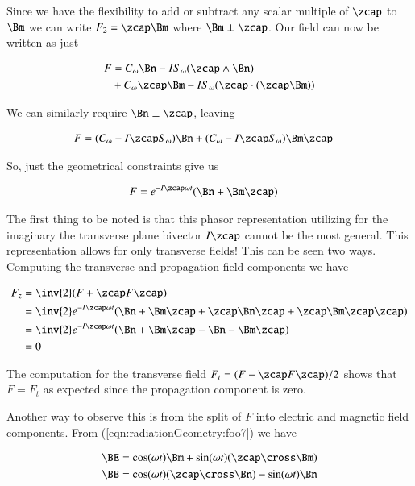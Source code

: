 Since we have the flexibility to add or subtract any scalar multiple of $\zcap$ to $\Bm$ we can write $F_2 = \zcap \Bm$ where $\Bm \perp \zcap$.  Our field can now be written as just

\begin{align*}
F &= 
 C_\omega \Bn - I S_\omega (\zcap \wedge \Bn)  \\
&+ C_\omega \zcap \Bm - I S_\omega (\zcap \cdot (\zcap \Bm)) \\
\end{align*}

We can similarly require $\Bn \perp \zcap$, leaving

\begin{align}\label{eqn:radiationGeometry:foo7}
F &= (C_\omega - I \zcap S_\omega ) \Bn  + (C_\omega - I \zcap S_\omega) \Bm \zcap
\end{align}

So, just the geometrical constraints give us

\begin{align}\label{eqn:radiationGeometry:foo6}
F &= e^{-I\zcap \omega t}(\Bn + \Bm \zcap)
\end{align}

The first thing to be noted is that this phasor representation utilizing for the imaginary the transverse plane bivector $I\zcap$ cannot be the most general.  This representation allows for only transverse fields!  This can be seen two ways.  Computing the transverse and propagation field components we have

\begin{align*}
F_z 
&= \inv{2}(F + \zcap F \zcap) \\
&= 
\inv{2} e^{-I\zcap \omega t}( \Bn + \Bm \zcap + \zcap \Bn \zcap + \zcap \Bm \zcap \zcap) \\
&= 
\inv{2} e^{-I\zcap \omega t}( \Bn + \Bm \zcap - \Bn - \Bm \zcap ) \\
&= 0
\end{align*}

The computation for the transverse field $F_t = (F - \zcap F \zcap)/2$ shows that $F = F_t$ as expected since the propagation component is zero.

Another way to observe this is from the split of $F$ into electric and magnetic field components.  From (\ref{eqn:radiationGeometry:foo7}) we have

\begin{align}\label{eqn:radiationGeometry:foo8}
\BE &= \cos(\omega t) \Bm + \sin(\omega t) (\zcap \cross \Bm) \\
\BB &= \cos(\omega t) (\zcap \cross \Bn) - \sin(\omega t) \Bn
\end{align}

